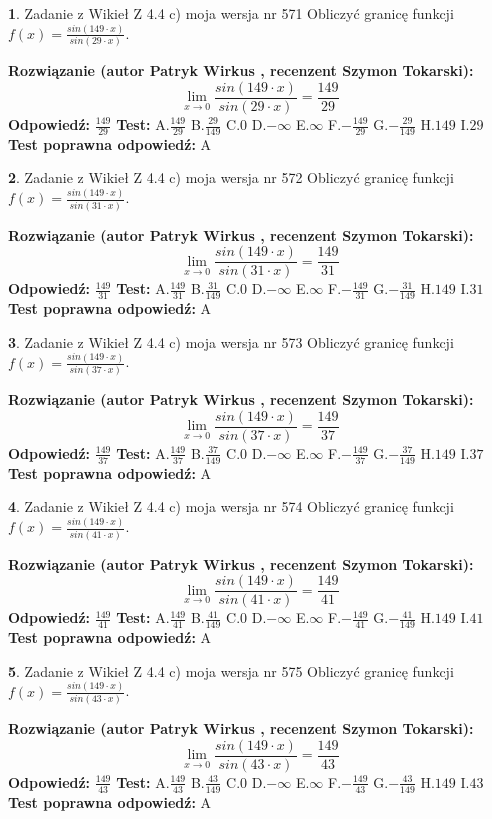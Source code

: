 \documentclass[12pt, a4paper]{article}
\theoremstyle{definition} %
\newtheorem{zad}{}
\newcommand{\zadStart}[1]{\begin{zad}#1\newline}
\newcommand{\zadStop}{\end{zad}}
\newcommand{\rozwStart}[2]{\noindent \textbf{Rozwiązanie (autor #1 , recenzent #2): }\newline}
\newcommand{\rozwStop}{\newline}
\newcommand{\odpStart}{\noindent \textbf{Odpowiedź:}\newline}
\newcommand{\odpStop}{\newline}
\newcommand{\testStart}{\noindent \textbf{Test:}\newline}
\newcommand{\testStop}{\newline}
\newcommand{\kluczStart}{\noindent \textbf{Test poprawna odpowiedź:}\newline}
\newcommand{\kluczStop}{\newline}
\begin{document}
\zadStart{Zadanie z Wikieł Z 4.4 c) moja wersja nr 571}
Obliczyć granicę funkcji $f(x)=\frac{sin(149\cdot x)}{sin(29\cdot x)}$.
\zadStop
\rozwStart{Patryk Wirkus}{Szymon Tokarski}
$$\lim\limits_{x\to 0}\frac{sin(149\cdot x)}{sin(29\cdot x)}=
\frac{149}{29}$$
\rozwStop
\odpStart
$\frac{149}{29}$
\odpStop
\testStart
A.$\frac{149}{29}$
B.$\frac{29}{149}$
C.$0$
D.$-\infty$
E.$\infty$
F.$-\frac{149}{29}$
G.$-\frac{29}{149}$
H.$149$
I.$29$
\testStop
\kluczStart
A
\kluczStop



\zadStart{Zadanie z Wikieł Z 4.4 c) moja wersja nr 572}
Obliczyć granicę funkcji $f(x)=\frac{sin(149\cdot x)}{sin(31\cdot x)}$.
\zadStop
\rozwStart{Patryk Wirkus}{Szymon Tokarski}
$$\lim\limits_{x\to 0}\frac{sin(149\cdot x)}{sin(31\cdot x)}=
\frac{149}{31}$$
\rozwStop
\odpStart
$\frac{149}{31}$
\odpStop
\testStart
A.$\frac{149}{31}$
B.$\frac{31}{149}$
C.$0$
D.$-\infty$
E.$\infty$
F.$-\frac{149}{31}$
G.$-\frac{31}{149}$
H.$149$
I.$31$
\testStop
\kluczStart
A
\kluczStop



\zadStart{Zadanie z Wikieł Z 4.4 c) moja wersja nr 573}
Obliczyć granicę funkcji $f(x)=\frac{sin(149\cdot x)}{sin(37\cdot x)}$.
\zadStop
\rozwStart{Patryk Wirkus}{Szymon Tokarski}
$$\lim\limits_{x\to 0}\frac{sin(149\cdot x)}{sin(37\cdot x)}=
\frac{149}{37}$$
\rozwStop
\odpStart
$\frac{149}{37}$
\odpStop
\testStart
A.$\frac{149}{37}$
B.$\frac{37}{149}$
C.$0$
D.$-\infty$
E.$\infty$
F.$-\frac{149}{37}$
G.$-\frac{37}{149}$
H.$149$
I.$37$
\testStop
\kluczStart
A
\kluczStop



\zadStart{Zadanie z Wikieł Z 4.4 c) moja wersja nr 574}
Obliczyć granicę funkcji $f(x)=\frac{sin(149\cdot x)}{sin(41\cdot x)}$.
\zadStop
\rozwStart{Patryk Wirkus}{Szymon Tokarski}
$$\lim\limits_{x\to 0}\frac{sin(149\cdot x)}{sin(41\cdot x)}=
\frac{149}{41}$$
\rozwStop
\odpStart
$\frac{149}{41}$
\odpStop
\testStart
A.$\frac{149}{41}$
B.$\frac{41}{149}$
C.$0$
D.$-\infty$
E.$\infty$
F.$-\frac{149}{41}$
G.$-\frac{41}{149}$
H.$149$
I.$41$
\testStop
\kluczStart
A
\kluczStop



\zadStart{Zadanie z Wikieł Z 4.4 c) moja wersja nr 575}
Obliczyć granicę funkcji $f(x)=\frac{sin(149\cdot x)}{sin(43\cdot x)}$.
\zadStop
\rozwStart{Patryk Wirkus}{Szymon Tokarski}
$$\lim\limits_{x\to 0}\frac{sin(149\cdot x)}{sin(43\cdot x)}=
\frac{149}{43}$$
\rozwStop
\odpStart
$\frac{149}{43}$
\odpStop
\testStart
A.$\frac{149}{43}$
B.$\frac{43}{149}$
C.$0$
D.$-\infty$
E.$\infty$
F.$-\frac{149}{43}$
G.$-\frac{43}{149}$
H.$149$
I.$43$
\testStop
\kluczStart
A
\kluczStop
\end{document}
